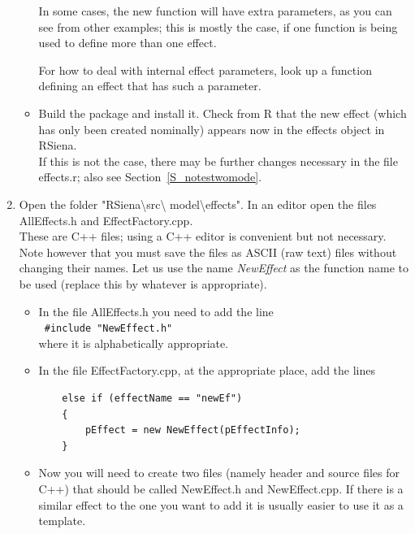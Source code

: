 \documentclass[a4paper,fleqn,11pt]{article}
\newcommand{\+}{\, + \,}
\newcommand{\sfn}[1]{\textsf{#1}}
\begin{document}
\begin{enumerate}
\begin{itemize}
              In some cases, the new function will have extra parameters,
              as you can see from other examples;
              this is mostly the case, if one function is being used to define
              more than one effect.

              For how to deal with internal effect parameters, look up
              a function defining an effect that has such
              a parameter.

		\item Build the package and install it.  Check from R that
              the new effect (which has only been created nominally)
              appears now in the effects object in RSiena.\\
              If this is not the case, there may be further changes necessary
              in the file \sfn{effects.r}; also see
              Section~\ref{S_notestwomode}.
		\end{itemize}
\item Open the folder
      \textsf{"RSiena\textbackslash src\textbackslash
         model\textbackslash effects"}.
         In an editor open the files \textsf{AllEffects.h}
         and  \textsf{EffectFactory.cpp}.\\
         These are C++ files; using a C++ editor is convenient
         but not necessary. Note however that you must save the files
         as ASCII (raw text) files without changing their names.
        Let us use the name \textit{NewEffect} as the function name
        to be used (replace this by whatever is appropriate).
		\begin{itemize}
			\item In the file AllEffects.h you need to add the line\\
                \texttt{ \#include "NewEffect.h" }\\
                 where it is alphabetically appropriate.
            \item In the file \textsf{EffectFactory.cpp}, at the appropriate place,
                  add the lines
                \begin{verbatim}
    else if (effectName == "newEf")
	{
		pEffect = new NewEffect(pEffectInfo);
	}
                \end{verbatim}
			\item Now you will need to create two files (namely header
                  and source files for
                   C++) that should be called \textsf{NewEffect.h} and
                   \textsf{NewEffect.cpp}.
                   If there is a similar effect to the one you want to add
                   it is usually easier to use it as a template.


\end{itemize}
\end{enumerate}
\end{document}
